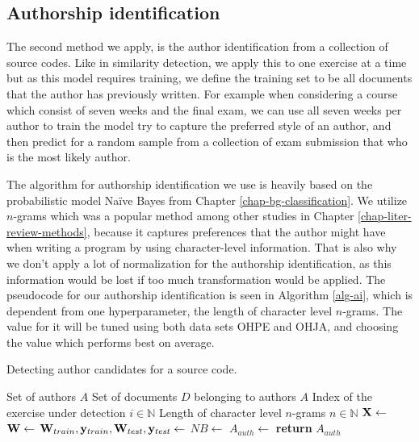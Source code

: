 \subsection{Authorship identification}

The second method we apply, is the author identification from a collection of source codes. Like in similarity detection, we apply this to one exercise at a time but as this model requires training, we define the training set to be all documents that the author has previously written. For example when considering a course which consist of seven weeks and the final exam, we can use all seven weeks per author to train the model \ie try to capture the preferred style of an author, and then predict for a random sample from a collection of exam submission that who is the most likely author.  

The algorithm for authorship identification we use is heavily based on the probabilistic model Naïve Bayes from Chapter \ref{chap-bg-classification}. We utilize $n$-grams which was a popular method among other studies in Chapter \ref{chap-liter-review-methods}, because it captures preferences that the author might have when writing a program by using character-level information. That is also why we don't apply a lot of normalization for the authorship identification, as this information would be lost if too much transformation would be applied. The pseudocode for our authorship identification is seen in Algorithm \ref{alg-ai}, which is dependent from one hyperparameter, the length of character level $n$-grams. The value for it will be tuned using both data sets OHPE and OHJA, and choosing the value which performs best on average. 

\clearpage

\begin{algorithm}[ht]
\caption{Detecting author candidates for a source code.}
\label{alg-ai}
\begin{algorithmic}

\Require Set of authors $A$
\Require Set of documents $D$ belonging to authors $A$
\Require Index of the exercise under detection $i \in \mathbb{N}$
\Require Length of character level $n$-grams $n \in \mathbb{N}$
   \State $\mathbf{X} \gets$ 
   \State $\mathbf{W} \gets$ 
   \State $\mathbf{W}_{train}, \mathbf{y}_{train}, \mathbf{W}_{test}, \mathbf{y}_{test} \gets$ 
   \State $NB \gets$ 
   \State $A_{auth} \gets$ 
   \State \textbf{return} $A_{auth}$
\EndProcedure
\end{algorithmic}
\end{algorithm}

